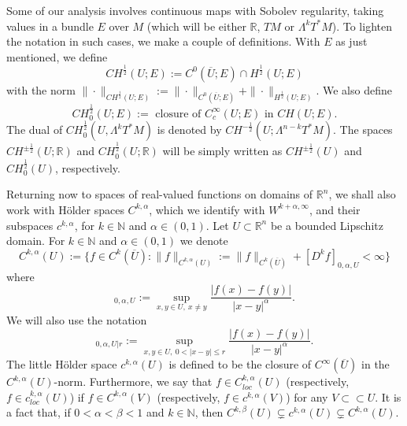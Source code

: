 \documentclass[12pt]{article}
\newcommand{\R}{\mathbb{R}}
\theoremstyle{plain}
\numberwithin{equation}{section}
\begin{document}
    Some of our analysis involves continuous maps with Sobolev regularity, taking values in a bundle $E$ over $M$ (which will be either $\R$, $TM$ or $\Lambda^k T^*M$). To lighten the notation in such cases, we make a couple of definitions. With $E$ as just mentioned, we define
    \begin{equation} \label{eq:def_CH12}
    CH^\frac12(U;E) := C^0(\overline U;E) \cap H^\frac12(U;E)
    \end{equation}
    with the norm $\|\cdot\|_{CH^\frac12(U;E)} := \|\cdot\|_{C^0(\overline U;E)} + \|\cdot\|_{H^\frac12(U;E)}$. We also define
    \begin{equation} \label{eq:def_CH12_0}
            CH_0^\frac12(U;E) := \text{ closure of } C^\infty_c(U;E) \text{ in } CH(U;E).
    \end{equation}
    The dual of $CH_0^\frac12(U,\Lambda^k T^* M)$ is denoted by $CH^{-\frac12}(U;\Lambda^{n-k} T^*M)$. The spaces $CH^{\pm\frac12}(U;\R)$ and $CH_0^{\frac12}(U;\R)$ will be simply written as $CH^{\pm\frac12}(U)$ and $CH_0^{\frac12}(U)$, respectively.

    Returning now to spaces of real-valued functions on domains of $\R^n$, we shall also work with H\"{o}lder spaces $C^{k,\alpha}$, which we identify with $W^{k+\alpha,\infty}$, and their subspaces $c^{k,\alpha}$, for $k \in \mathbb{N}$ and $\alpha \in (0,1)$. Let $U \subset \R^n$ be a bounded Lipschitz domain. For $k\in \mathbb{N}$ and $\alpha \in (0,1)$ we denote
    \begin{equation*}
        C^{k,\alpha}(U) := \{f \in C^k(\overline U) : \|f\|_{C^{k,\alpha}(U)} := \|f\|_{C^k(\overline U)} + [D^k f]_{0,\alpha, U } < \infty\}
    \end{equation*}
    where
    \begin{equation*}
        [f]_{0,\alpha,U} := \sup_{x,y \in U,~x \neq y} \frac{|f(x)-f(y)|}{|x-y|^\alpha}.
    \end{equation*}
    We will also use the notation
    \begin{equation*}
        [f]_{0,\alpha,U|r} := \sup_{x,y \in U,~0 < |x-y| \leq r} \frac{|f(x)-f(y)|}{|x-y|^\alpha}.
    \end{equation*}
    The little Hölder space $c^{k,\alpha}(U)$ is defined to be the closure of $C^\infty(\overline U)$ in the $C^{k,\alpha}(U)$-norm.
    Furthermore, we say that $f \in C^{k,\alpha}_{loc}(U)$ (respectively, $f \in c^{k,\alpha}_{loc}(U)$) if $f \in C^{k,\alpha}(V)$ (respectively, $f \in c^{k,\alpha}(V)$) for any $V \subset\subset U$. It is a fact that, if $0 < \alpha < \beta < 1$ and $k \in \mathbb{N}$, then $C^{k,\beta}(U) \subsetneq c^{k,\alpha}(U) \subsetneq C^{k,\alpha}(U)$.
    
\end{document}
